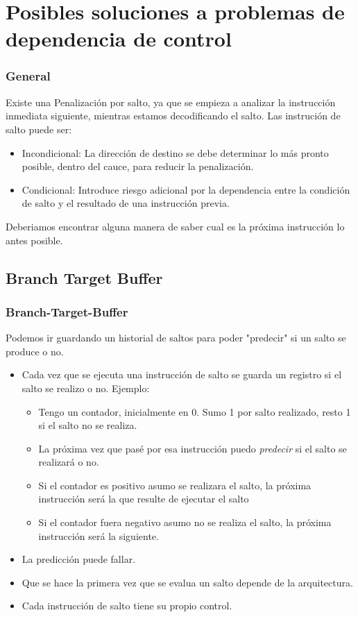 \documentclass{beamer}
\begin{document}
\section{Posibles soluciones a problemas de dependencia de control}
\begin{frame}
\frametitle{General}
Existe una Penalización por salto, ya que se empieza a analizar la instrucción inmediata siguiente, mientras estamos decodificando el salto. Las instrución de salto puede ser: 
\begin{itemize}
\item Incondicional: La dirección de destino se debe determinar lo más pronto posible, dentro del cauce, para reducir la penalización.
\item Condicional: Introduce riesgo adicional por la dependencia entre la condición de salto y el resultado de una instrucción previa.
\end{itemize}
Deberiamos encontrar alguna manera de saber cual es la próxima instrucción lo antes posible.
\end{frame}


\subsection{Branch Target Buffer}
\begin{frame}
\frametitle{Branch-Target-Buffer}
Podemos ir guardando un historial de saltos para poder "predecir" si un salto se produce o no.
\begin{itemize}
\item Cada vez que se ejecuta una instrucción de salto se guarda un registro si el salto se realizo o no. Ejemplo:
\begin{itemize}
\item Tengo un contador, inicialmente en 0. Sumo 1 por salto realizado, resto 1 si el salto no se realiza.
\item La próxima vez que pasé por esa instrucción puedo \emph{predecir} si el salto se realizará o no. 
\item Si el contador es positivo asumo se realizara el salto, la próxima instrucción será la que resulte de ejecutar el salto
\item Si el contador fuera negativo asumo no se realiza el salto, la próxima instrucción será la siguiente.
\end{itemize}
\item La predicción puede fallar.
\item Que se hace la primera vez que se evalua un salto depende de la arquitectura.
\item Cada instrucción de salto tiene su propio control.
\end{itemize}
\end{frame}
\end{document}
